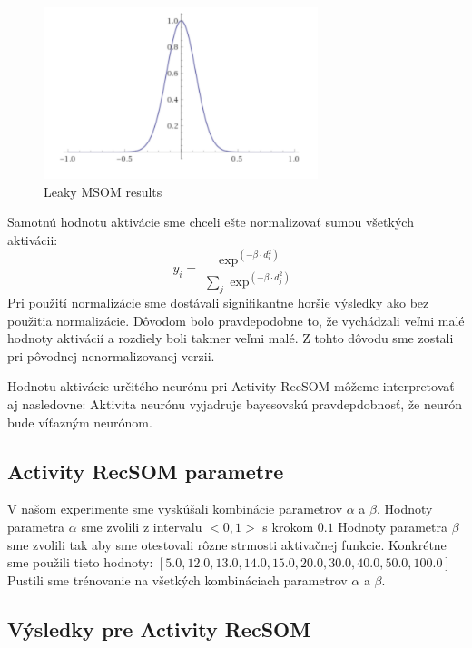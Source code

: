 \begin{figure}[H]
    \centering
    \includegraphics[width=8cm]{assets/gaus30}
    \caption{Leaky MSOM results}
\end{figure}

Samotnú hodnotu aktivácie sme chceli ešte normalizovať sumou všetkých aktivácii:
\begin{equation}
    y_{i} = \frac{\exp^{(-\beta \cdot d_{i}^{2})}}{\sum_{j} \exp^{(-\beta \cdot d_{j}^{2})}}
\end{equation}
Pri použití normalizácie sme dostávali signifikantne horšie výsledky
ako bez použitia normalizácie. Dôvodom bolo pravdepodobne to, že vychádzali veľmi malé
hodnoty aktivácií a rozdiely boli takmer veľmi malé. Z tohto dôvodu sme zostali 
pri pôvodnej nenormalizovanej verzii.

Hodnotu aktivácie určitého neurónu pri Activity RecSOM môžeme interpretovať aj nasledovne:
Aktivita neurónu vyjadruje bayesovskú pravdepdobnosť, že neurón bude víťazným neurónom.

\subsection{Activity RecSOM parametre}
V našom experimente sme vyskúšali kombinácie parametrov $\alpha$ a $\beta$.
Hodnoty parametra $\alpha$ sme zvolili z intervalu $<0, 1>$ s krokom $0.1$
Hodnoty parametra $\beta$ sme zvolili tak aby sme otestovali rôzne strmosti aktivačnej funkcie.
Konkrétne sme použili tieto hodnoty: $[5.0, 12.0, 13.0, 14.0, 15.0, 20.0, 30.0, 40.0, 50.0, 100.0]$
Pustili sme trénovanie na všetkých kombináciach parametrov $\alpha$ a $\beta$.

\subsection{Výsledky pre Activity RecSOM}

